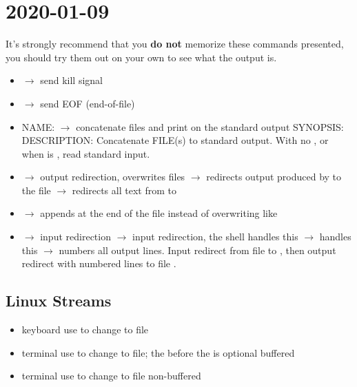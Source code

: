 \section{2020-01-09}
It's strongly recommend that you \textbf{do not} memorize these commands presented,
you should try them out on your own to see what the output is.

\begin{itemize}
    \item {} $ \rightarrow $ send kill signal
    \item {} $ \rightarrow $ send EOF (end-of-file)
    \item NAME:  $ \rightarrow $ concatenate files and print on the standard output
    \subitem SYNOPSIS: 
    \subitem DESCRIPTION: Concatenate FILE(s) to standard output.
    With no , or when  is \code{-}, read standard input.
    \item \code{>} $ \rightarrow $ output redirection, overwrites files
    \subitem {} $ \rightarrow $ redirects output produced by
     to the file 
    \subitem {} $ \rightarrow $ redirects all text from 
     to 
    \item \code{>{}>} $ \rightarrow $ appends at the end of the file instead of overwriting like 
    \code{>}
    \item \code{<} $ \rightarrow $ input redirection
    \subitem {} $ \rightarrow $
    input redirection, the shell handles this
    \subitem {} $ \rightarrow $
     handles this
    \subitem {} $ \rightarrow $
     numbers all output lines. Input redirect from file  to
    , then output redirect with numbered lines to file .
\end{itemize}

\subsection{Linux Streams}

\begin{itemize}
    \item {}
    \subitem keyboard
    \subitem use \code{<} to change to file
    \item {}
    \subitem terminal
    \subitem use  to change to file; the  before the \code{>} 
    is optional
    \subitem buffered
    \item {}
    \subitem terminal
    \subitem use  to change to file
    \subitem non-buffered
\end{itemize}

